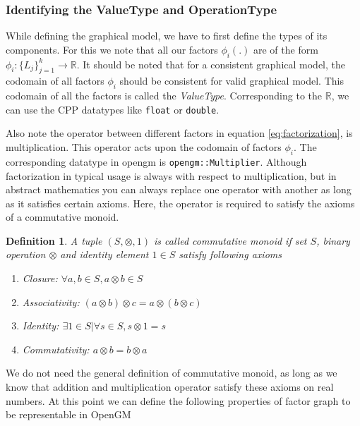 \documentclass[12pt,oneside,letterpaper]{article}
\newtheorem{definition}{Definition}
\begin{document}
\subsubsection{Identifying the ValueType and OperationType}

While defining the graphical model, we have to first define the types of its
components. For this we note that all our factors $\phi_i(.)$ are of the form
$\phi_i : \{L_j\}_{j=1}^{k} \rightarrow \mathbb{R}$. It should be noted that
for a consistent graphical model, the codomain of all factors $\phi_i$ should
be consistent for valid graphical model. This codomain of all the factors is called
the \emph{ValueType}. Corresponding to the $\mathbb{R}$, we can use the CPP
datatypes like \lstinline|float| or \lstinline|double|.

Also note the operator between different factors in equation
\eqref{eq:factorization}, is multiplication. This operator acts upon the
codomain of factors $\phi_i$. The corresponding datatype in opengm is
\lstinline|opengm::Multiplier|.  Although factorization in typical usage is
always with respect to multiplication, but in abstract mathematics you can
always replace one operator with another as long as it satisfies certain
axioms. Here, the operator is required to satisfy the axioms of a commutative
monoid.

\begin{definition}
  A tuple $(S, \otimes, 1)$ is called commutative monoid if set $S$, binary operation $\otimes$ and identity element $1 \in S$ satisfy following axioms
  \begin{enumerate}
    \item Closure: $\forall a, b \in S, a \otimes b \in S$
    \item Associativity: $(a \otimes b) \otimes  c = a \otimes (b \otimes  c)$
    \item Identity: $\exists 1 \in S | \forall s \in S, s \otimes 1 = s$
    \item Commutativity: $a\otimes b = b\otimes a$
  \end{enumerate}
\end{definition}

We do not need the general definition of commutative monoid, as long as we know
that addition and multiplication operator satisfy these axioms on real numbers.
At this point we can define the following properties of factor graph to be
representable in OpenGM
\end{document}
